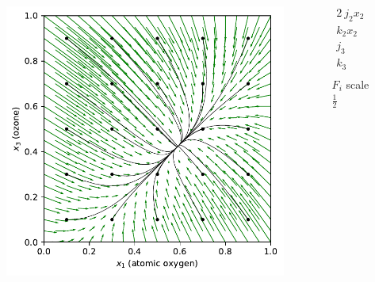 \begin{columns}
\begin{column}{0.65\textwidth}
\vspace{-0.35in}
\begin{figure}
\includegraphics[scale=0.65]{../Plots/chapman.pdf}
\end{figure}
\end{column}
\begin{column}{0.35\textwidth}
\vspace{-0.35in}
\begin{align*}
2 \ j_2 x_2 &= 0.1 \\
k_2 x_2 &= 0.3 \\
j_3 &= 0.3 \\
k_3 &= 0.2 \\
\end{align*}
\hspace{0.4in} $F_i$ scale $\frac{1}{2}$
\end{column}
\end{columns}

